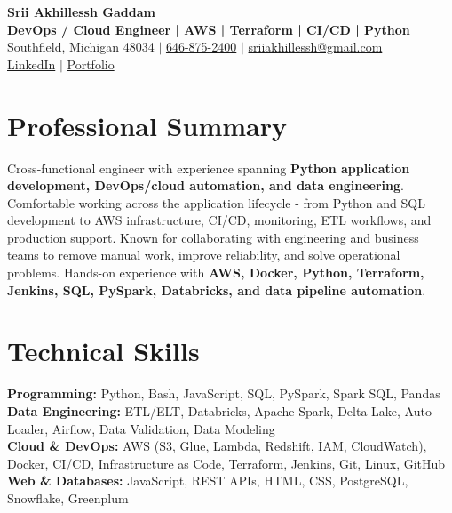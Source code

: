 \documentclass[letterpaper,10pt]{article}
\begin{document}
\fontsize{9.35pt}{10.45pt}\selectfont

\begin{center}
    {\LARGE \textbf{Srii Akhillessh Gaddam}} \\[-1pt]
    \textbf{DevOps / Cloud Engineer | AWS | Terraform | CI/CD | Python} \\[2pt]
    Southfield, Michigan 48034 $|$
    \href{tel:6468752400}{646-875-2400} $|$
    \href{mailto:sriiakhillessh@gmail.com}{sriiakhillessh@gmail.com} \\[1pt]
    \href{https://www.linkedin.com/in/srii-akhiilessh-gaddam-b48668191/}{LinkedIn} $|$
    \href{https://sriiakhillesshg.github.io/portfolio/}{Portfolio}
\end{center}
\vspace{-8pt}

\section{Professional Summary}
\small{Cross-functional engineer with experience spanning \textbf{Python application development, DevOps/cloud automation, and data engineering}. Comfortable working across the application lifecycle - from Python and SQL development to AWS infrastructure, CI/CD, monitoring, ETL workflows, and production support. Known for collaborating with engineering and business teams to remove manual work, improve reliability, and solve operational problems. Hands-on experience with \textbf{AWS, Docker, Python, Terraform, Jenkins, SQL, PySpark, Databricks, and data pipeline automation}.}

\section{Technical Skills}
\small{
\textbf{Programming:} Python, Bash, JavaScript, SQL, PySpark, Spark SQL, Pandas \\
\textbf{Data Engineering:} ETL/ELT, Databricks, Apache Spark, Delta Lake, Auto Loader, Airflow, Data Validation, Data Modeling \\
\textbf{Cloud \& DevOps:} AWS (S3, Glue, Lambda, Redshift, IAM, CloudWatch), Docker, CI/CD, Infrastructure as Code, Terraform, Jenkins, Git, Linux, GitHub \\
\textbf{Web \& Databases:} JavaScript, REST APIs, HTML, CSS, PostgreSQL, Snowflake, Greenplum
}
\end{document}
